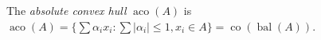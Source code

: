 The \emph{absolute convex hull} $\operatorname{aco}(A)$ is $\operatorname{aco}(A) = \{\sum \alpha_i x_i : \sum |\alpha_i| \leqslant 1, x_i \in A\} = \operatorname{co}(\operatorname{bal}(A))$.
